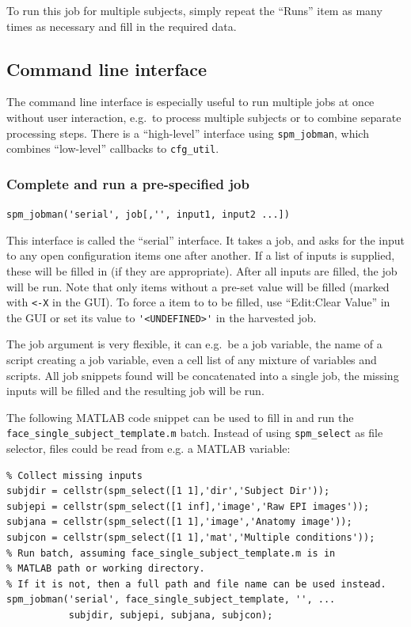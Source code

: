 To run this job for multiple subjects, simply repeat the ``Runs'' item
as many times as necessary and fill in the required data.

\subsection{Command line interface}
\label{sec:batch_interface_cmd}

The command line interface is especially useful to run multiple jobs
at once without user interaction, e.g.\ to process multiple subjects
or to combine separate processing steps. There is a ``high-level''
interface using \verb|spm_jobman|, which combines ``low-level''
callbacks to \verb|cfg_util|.

\subsubsection{Complete and run a pre-specified job}
\label{sec:batch_interface_cmd_cfg_serial}

\verb|spm_jobman('serial', job[,'', input1, input2 ...])|

This interface is called the ``serial'' interface. It takes a job, and asks
for the input to any open configuration items one after another. If a list of
inputs is supplied, these will be filled in (if they are appropriate). After
all inputs are filled, the job will be run. Note that only items 
without a pre-set value will be filled (marked with \verb|<-X| in
the GUI). To force a item to to be filled, use ``Edit:Clear Value''
in the GUI or set its value to \verb|'<UNDEFINED>'| in the harvested job.

The job argument is very flexible, it can e.g.\ be a job variable, the
name of a script creating a job variable, even a cell list of any
mixture of variables and scripts. All job snippets found will be
concatenated into a single job, the missing inputs will be filled and
the resulting job will be run.

The following MATLAB code snippet can be used to fill in and run the
\verb|face_single_subject_template.m| batch. Instead of using
\verb|spm_select| as file selector, files could be read from e.g. a MATLAB
variable: 

\begin{verbatim}
% Collect missing inputs
subjdir = cellstr(spm_select([1 1],'dir','Subject Dir'));
subjepi = cellstr(spm_select([1 inf],'image','Raw EPI images'));
subjana = cellstr(spm_select([1 1],'image','Anatomy image'));
subjcon = cellstr(spm_select([1 1],'mat','Multiple conditions'));
% Run batch, assuming face_single_subject_template.m is in 
% MATLAB path or working directory.
% If it is not, then a full path and file name can be used instead.
spm_jobman('serial', face_single_subject_template, '', ...
           subjdir, subjepi, subjana, subjcon);
\end{verbatim}

